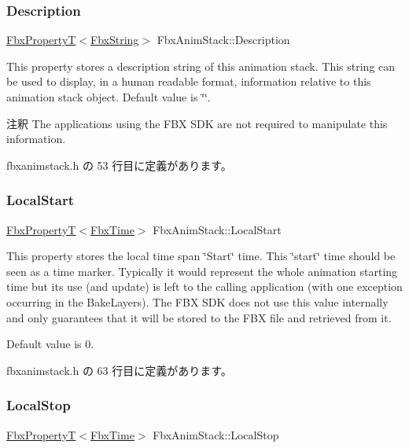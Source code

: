 \subsubsection{\texorpdfstring{Description}{Description}}
{\footnotesize\ttfamily \hyperlink{class_fbx_property_t}{Fbx\+PropertyT}$<$\hyperlink{class_fbx_string}{Fbx\+String}$>$ Fbx\+Anim\+Stack\+::\+Description}

This property stores a description string of this animation stack. This string can be used to display, in a human readable format, information relative to this animation stack object. Default value is \char`\"{}\char`\"{}. \begin{DoxyRemark}{注釈}
The applications using the F\+BX S\+DK are not required to manipulate this information. 
\end{DoxyRemark}


 fbxanimstack.\+h の 53 行目に定義があります。

\mbox{\label{class_fbx_anim_stack_a140ba636c0907144d60d2901c0995456}} 
\subsubsection{\texorpdfstring{Local\+Start}{LocalStart}}
{\footnotesize\ttfamily \hyperlink{class_fbx_property_t}{Fbx\+PropertyT}$<$\hyperlink{class_fbx_time}{Fbx\+Time}$>$ Fbx\+Anim\+Stack\+::\+Local\+Start}

This property stores the local time span \char`\"{}\+Start\char`\"{} time. This \char`\"{}start\char`\"{} time should be seen as a time marker. Typically it would represent the whole animation starting time but its use (and update) is left to the calling application (with one exception occurring in the Bake\+Layers). The F\+BX S\+DK does not use this value internally and only guarantees that it will be stored to the F\+BX file and retrieved from it.

Default value is 0. 

 fbxanimstack.\+h の 63 行目に定義があります。

\mbox{\label{class_fbx_anim_stack_a07be87cbd6b3226be489c69b5466a72d}} 
\subsubsection{\texorpdfstring{Local\+Stop}{LocalStop}}
{\footnotesize\ttfamily \hyperlink{class_fbx_property_t}{Fbx\+PropertyT}$<$\hyperlink{class_fbx_time}{Fbx\+Time}$>$ Fbx\+Anim\+Stack\+::\+Local\+Stop}

